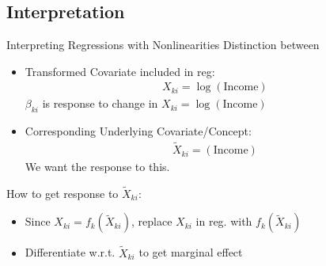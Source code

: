 \documentclass[aspectratio=169, handout]{beamer}
\begin{document}
\subsection{Interpretation}


{\footnotesize
\begin{frame}{Interpreting Regressions with Nonlinearities}
Distinction between
\begin{itemize}
  \item \alert{Transformed Covariate} included in reg:
    \begin{align*}
      X_{ki}=\log(\text{Income})
    \end{align*}
    $\beta_{ki}$ is response to change in $X_{ki}=\log(\text{Income})$

  \item Corresponding \alert{Underlying Covariate/Concept}:
    \begin{align*}
      \tilde{X}_{ki} = (\text{Income})
    \end{align*}
    We want the response to this.
\end{itemize}
How to get response to $\tilde{X}_{ki}$:
\begin{itemize}
  \item
    Since $X_{ki}=f_k(\tilde{X}_{ki})$, replace
    $X_{ki}$ in reg. with $f_k(\tilde{X}_{ki})$
  \item Differentiate w.r.t. $\tilde{X}_{ki}$ to get
    \alert{marginal effect}
\end{itemize}
\end{frame}
}
\end{document}
